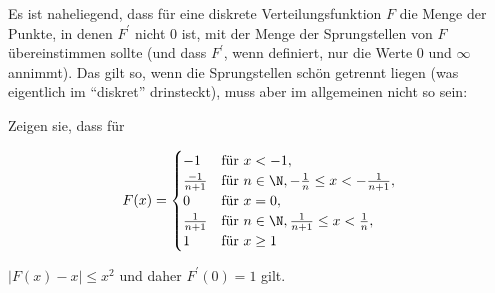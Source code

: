 
\begin{exercise}

Es ist naheliegend, dass für eine diskrete Verteilungsfunktion $F$ die Menge der Punkte, in denen $F^\prime$ nicht $0$ ist, mit der Menge der Sprungstellen von $F$ übereinstimmen sollte (und dass $F^\prime$, wenn definiert, nur die Werte $0$ und $\infty$ annimmt).
Das gilt so, wenn die Sprungstellen schön getrennt liegen (was eigentlich im \enquote{diskret} drinsteckt), muss aber im allgemeinen nicht so sein:

Zeigen sie, dass für

\begin{align*}
    F(x)
    =
    \begin{cases}
        -1               & \text{für}~ x < -1,                                           \\
        \frac{-1}{n + 1} & \text{für}~ n \in \N, -\frac{1}{n} \leq x < -\frac{1}{n + 1}, \\
        0                & \text{für}~ x = 0,                                            \\
        \frac{1}{n + 1}  & \text{für}~ n \in \N, \frac{1}{n + 1} \leq x < \frac{1}{n},   \\
        1                & \text{für}~ x \geq 1
    \end{cases}
\end{align*}

$|F(x) - x| \leq x^2$ und daher $F^\prime(0) = 1$ gilt.

\end{exercise}


